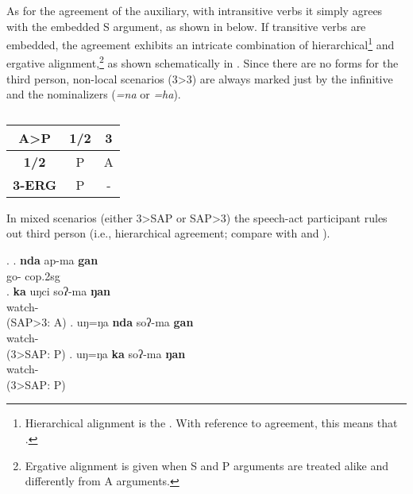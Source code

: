 As for the agreement of the auxiliary, with intransitive verbs it simply agrees with the embedded S argument, as shown in \Next[a] below. If transitive verbs are embedded, the agreement exhibits an intricate combination of hierarchical\footnote{Hierarchical alignment is the  \citep[10]{Siewierska1998On-nominal}. With reference to agreement, this means that   \citep[66]{Nichols1992Language}.} and ergative alignment,\footnote{Ergative alignment is given when S and P arguments are treated alike and differently from A arguments. 
} as shown schematically in .  Since there are no forms for the third person, non-local scenarios (3>3) are always marked just by the infinitive and the nominalizers (\emph{=na} or \emph{=ha}). 


\begin{table}[htp]
\begin{center}
\begin{tabular}{c|cc}
\hline
{\bf A>P}	&{\bf 1/2}&{\bf 3}\\
\hline
 {\bf 1/2}&P&A\\
 {\bf 3-ERG}	&P&-\\
\hline
\end{tabular}
\caption{}
\label{align-sum-cop}
\end{center} 
\end{table}


In mixed scenarios (either 3>SAP or SAP>3)  the speech-act participant rules out third person (i.e., hierarchical agreement; compare \Next[b] with \Next[c] and \Next[d]). 

\ex. \ag. {\bf nda}  ap-ma {\bf gan}\\
 go- {\sc cop.2sg} \\
\bg. {\bf ka} uŋci soʔ-ma  {\bf ŋan}\\
  watch-  \\  
	(SAP>3: A)
\bg. uŋ=ŋa {\bf nda}  soʔ-ma {\bf gan}\\
    watch-  \\  
	(3>SAP: P)
\bg. uŋ=ŋa {\bf ka}  soʔ-ma {\bf ŋan}\\
    watch-  \\  
	(3>SAP: P)


